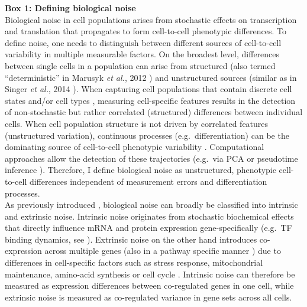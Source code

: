 \begin{Comment}
\hspace{-2.5mm}\textbf{Box 1: Defining biological noise}\label{box1}\\
\small
Biological noise in cell populations arises from stochastic effects on transcription and translation that propagates to form cell-to-cell phenotypic differences. To define noise, one needs to distinguish between different sources of cell-to-cell variability in multiple measurable factors. On the broadest level, differences between single cells in a population can arise from structured (also termed “deterministic” in Marusyk \emph{et al.}, 2012 \citep{Marusyk2012}) and unstructured sources (similar as in Singer \emph{et al.}, 2014 \citep{Singer2014}). When capturing cell populations that contain discrete cell states and/or cell types \citep{Paul2015, Ibarra-Soria2018, Rosenberg2018}, measuring cell-specific features results in the detection of non-stochastic but rather correlated (structured) differences between individual cells. When cell population structure is not driven by correlated features (unstructured variation), continuous processes (e.g.~differentiation) can be the dominating source of cell-to-cell phenotypic variability \citep{Dahlin2018}. Computational approaches allow the detection of these trajectories (e.g.~via \gls{PCA} or pseudotime inference \citep{Trapnell2014, Angerer2015}). Therefore, I define biological noise as unstructured, phenotypic cell-to-cell differences independent of measurement errors and differentiation processes. \\

As previously introduced \citep{Elowitz2002}, biological noise can broadly be classified into intrinsic and extrinsic noise. Intrinsic noise originates from stochastic biochemical effects that directly influence mRNA and protein expression gene-specifically (e.g.~\gls{TF} binding dynamics, see \citep{Swain2002}). Extrinsic noise on the other hand introduces co-expression across multiple genes (also in a pathway specific manner \citep{Raser2005}) due to differences in cell-specific factors such as stress response, mitochondrial maintenance, amino-acid synthesis \citep{Stewart-Ornstein2012} or cell cycle \citep{Zopf2013}. Intrinsic noise can therefore be measured as expression differences between co-regulated genes in one cell, while extrinsic noise is measured as co-regulated variance in gene sets across all cells.
\end{Comment}

\newpage

